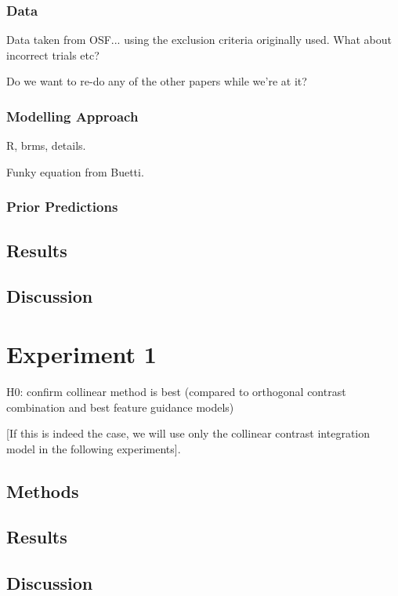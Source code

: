 \subsubsection{Data}

Data taken from OSF... using the exclusion criteria originally used. What about incorrect trials etc? 

Do we want to re-do any of the other papers while we're at it?

\subsubsection{Modelling Approach}

R, brms, details.

Funky equation from Buetti. 

\subsubsection{Prior Predictions}

\subsection{Results}

\subsection{Discussion}


\section{Experiment 1}

H0: confirm collinear method is best (compared to orthogonal contrast combination and best feature guidance models)

[If this is indeed the case, we will use only the collinear contrast integration model in the following experiments].

\subsection{Methods}

\subsection{Results}

\subsection{Discussion}



